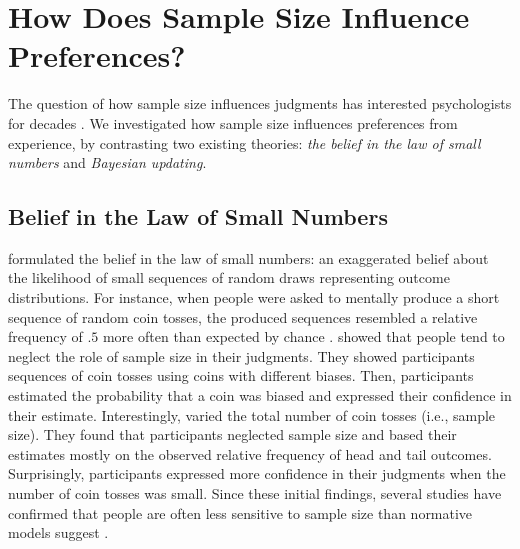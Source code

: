 \documentclass[a4paper,man, natbib]{apa6} %
\begin{document}

\section{How Does Sample Size Influence Preferences?}
The question of how sample size influences judgments has interested psychologists for decades \citep[e.g.,][]{Tversky1971, Griffin1992}. We investigated how sample size influences preferences from experience, by contrasting two existing theories: \textit{the belief in the law of small numbers} \citep{Tversky1971} and \textit{Bayesian updating}. 

\subsection{Belief in the Law of Small Numbers}
\cite{Tversky1971} formulated the belief in the law of small numbers: an exaggerated belief about the likelihood of small sequences of random draws representing outcome distributions. %
For instance, when people were asked to mentally produce a short sequence of random coin tosses, the produced sequences resembled a relative frequency of $.5$ more often than expected by chance \citep{Tversky1971}. \cite{Griffin1992} showed that people tend to neglect the role of sample size in their judgments. They showed participants sequences of coin tosses using coins with different biases. Then, participants estimated the probability that a coin was biased and expressed their confidence in their estimate. Interestingly, \cite{Griffin1992} varied the total number of coin tosses (i.e., sample size). They found that participants neglected sample size and based their estimates mostly on the observed relative frequency of head and tail outcomes. Surprisingly, participants expressed more confidence in their judgments when the number of coin tosses was small. Since these initial findings, several studies have confirmed that people are often less sensitive to sample size than normative models suggest \citep[e.g.,][]{Obrecht2007,Kutzner2016}. 
\end{document}
